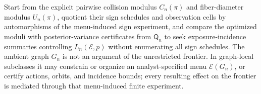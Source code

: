 Start from the explicit pairwise collision modulus \(C_n(\pi)\) and fiber-diameter modulus \(U_n(\pi)\), quotient their sign schedules and observation cells by automorphisms of the menu-induced sign experiment, and compare the optimized moduli with posterior-variance certificates from \(\mathsf Q_n\) to seek exposure-incidence summaries controlling \(L_n(\mathcal E,\bar p)\) without enumerating all sign schedules. The ambient graph \(G_n\) is not an argument of the unrestricted frontier. In graph-local subclasses it may constrain or organize an analyst-specified menu \(\mathcal E(G_n)\), or certify actions, orbits, and incidence bounds; every resulting effect on the frontier is mediated through that menu-induced finite experiment.